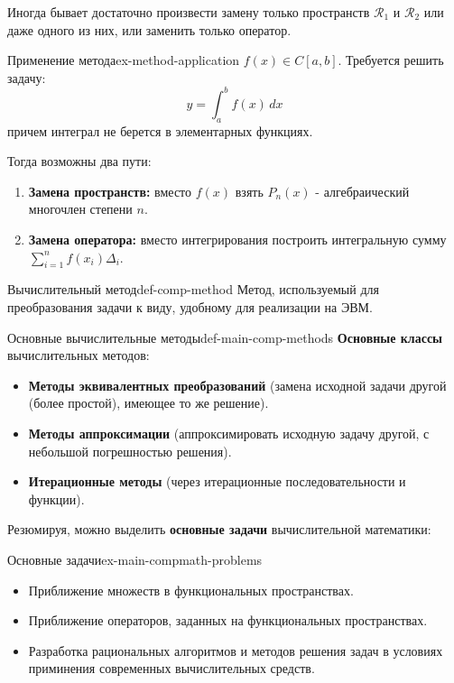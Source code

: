 \documentclass[14pt]{extarticle}
\begin{document}
        Иногда бывает достаточно произвести замену только пространств $\mathscr{R}_{1}$ и $\mathscr{R}_{2}$ или даже одного из них, или заменить только оператор.

        \begin{example}{Применение метода}{ex-method-application}
            $f(x) \in C[a, b]$. Требуется решить задачу:
            $$y = \int_{a}^{b} f(x) \, dx$$
            причем интеграл не берется в элементарных функциях.

            Тогда возможны два пути:
            \begin{enumerate}
                \item \textbf{Замена пространств:} вместо $f(x)$ взять $P_{n}(x)$ - алгебраический многочлен степени $n$.
                \item \textbf{Замена оператора:} вместо интегрирования построить интегральную сумму $\sum_{i=1}^{n}f(x_{i})\Delta_{i}$.
            \end{enumerate}
        \end{example}

        \begin{definition}{Вычислительный метод}{def-comp-method}
            Метод, используемый для преобразования задачи к виду, удобному для реализации на ЭВМ.
        \end{definition}

        \begin{definition}{Основные вычислительные методы}{def-main-comp-methods}
            \textbf{Основные классы} вычислительных методов:
            \begin{itemize}
                \item \textbf{Методы эквивалентных преобразований} (замена исходной задачи другой (более простой), имеющее то же решение).
                \item \textbf{Методы аппроксимации} (аппроксимировать исходную задачу другой, с небольшой погрешностью решения).
                \item \textbf{Итерационные методы} (через итерационные последовательности и функции).
            \end{itemize}

        \end{definition}

        Резюмируя, можно выделить \textbf{основные задачи} вычислительной математики:

        \begin{example}{Основные задачи}{ex-main-compmath-problems}
            \begin{itemize}
                \item Приближение множеств в функциональных пространствах.
                \item Приближение операторов, заданных на функциональных пространствах.
                \item Разработка рациональных алгоритмов и методов решения задач в условиях приминения современных вычислительных средств.
            \end{itemize}
        \end{example}
\end{document}
